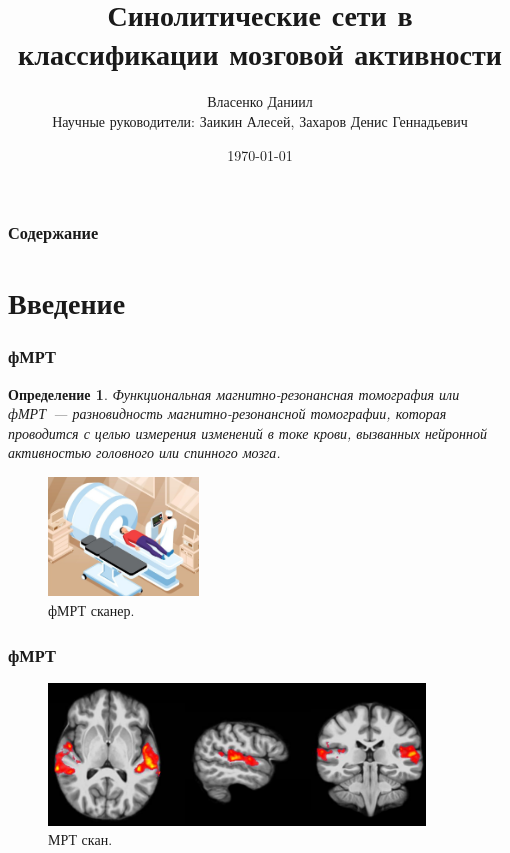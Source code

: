 \documentclass{beamer}
\newtheorem{definition_}{Определение}
\begin{document}
	\title{Синолитические сети в классификации мозговой активности}  
	\author{Власенко Даниил\\
	{\footnotesize Научные руководители: Заикин Алесей, Захаров Денис Геннадьевич}
	}
	\date{\today} 
	
	\begin{frame}
		\titlepage
	\end{frame}

	\begin{frame}
		\frametitle{Содержание}
		\tableofcontents
	\end{frame} 

	\section{Введение} 
	\begin{frame}
		\frametitle{фМРТ} 
							
		\begin{definition_}
			Функциональная магнитно-резонансная томография или фМРТ~--- разновидность магнитно-резонансной томографии, которая проводится с целью измерения изменений в токе крови, вызванных нейронной активностью головного или спинного мозга. 
		\end{definition_}
	
		\begin{figure}
			\includegraphics[width=4cm]{../images/fmri_1.jpeg}
			\caption{фМРТ сканер.} 
			\label{fg:1}
		\end{figure}		
	\end{frame}

	\begin{frame} 
		\frametitle{фМРТ}
		\begin{figure}
			\includegraphics[width=10cm]{../images/fmri_2.png}
			\caption{МРТ скан.} 
			\label{fg:2}
		\end{figure}
	\end{frame}
\end{document}
